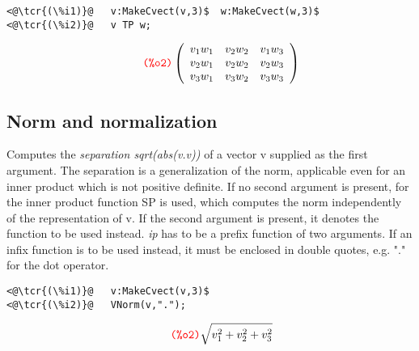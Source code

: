\documentclass[../Maxima_Workbook.tex]{subfiles}
\begin{document}
\lz \begin{small}
\color{blue}
\begin{lstlisting}
<@\tcr{(\%i1)}@   v:MakeCvect(v,3)$  w:MakeCvect(w,3)$
<@\tcr{(\%i2)}@   v TP w;
\end{lstlisting}
\vspace{-6mm} \[\tag*{\tcr{\ttfamily (\%o2)}} \left( \begin{array} {ccc} v_1w_1 & v_2w_2 & v_1w_3 \\ v_2w_1 & v_2w_2 & v_2w_3 \\ v_3w_1 & v_3w_2 & v_3w_3 \end{array} \right) \]
\color{black}
\end{small}

\vspace{-4mm} \subsection{Norm and normalization}

\lz {} \hfill {}

\lz Computes the \emph{separation sqrt(abs(v.v))} of a vector v supplied as the first argument. The separation is a generalization of the norm, applicable even for an inner product which is not positive definite. If no second argument is present, for the inner product function SP is used, which computes the norm independently of the representation of v. If the second argument is present, it denotes the function to be used instead. \emph{ip} has to be a prefix function of two arguments. If an infix function is to be used instead, it must be enclosed in double quotes, e.g. "." for the dot operator.

\begin{small}
\color{blue}
\begin{lstlisting}
<@\tcr{(\%i1)}@   v:MakeCvect(v,3)$
<@\tcr{(\%i2)}@   VNorm(v,".");
\end{lstlisting}
\vspace{-6mm} \[\tag*{\tcr{\ttfamily (\%o2)}} \sqrt{v_1^2+v_2^2+v_3^2} \]
\color{black}
\end{small}

 \hfill {} \\
 \qquad {} \hfill {}
\end{document}
